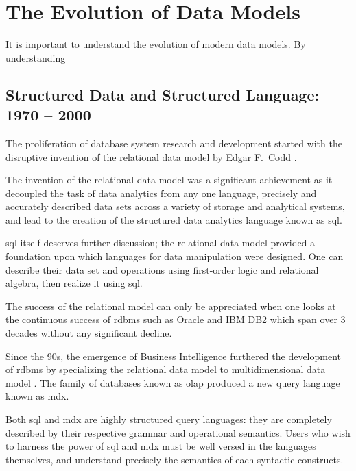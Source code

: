 



\section{The Evolution of Data Models}
	It is important to understand the evolution of modern data models.  By understanding 
	
	\subsection{Structured Data and Structured Language:  1970 -- 2000}
		The proliferation of database system research and development started with the disruptive invention of the relational data model by Edgar F.~Codd \cite{codd-79}.
		
		The invention of the relational data model was a significant achievement as it decoupled the task of data analytics from any one language, precisely and accurately described data sets across a variety of storage and analytical systems, and lead to the creation of the structured data analytics language known as \gls{sql}.
		
		\gls{sql} itself deserves further discussion; the relational data model provided a foundation upon which languages for data manipulation were designed.  One can describe their data set and operations using first-order logic and relational algebra, then realize it using \gls{sql}.
		
		The success of the relational model can only be appreciated when one looks at the continuous success of \gls{rdbms} such as Oracle and IBM DB2 which span over 3 decades without any significant decline.
		
		Since the 90s, the emergence of Business Intelligence \cite{bikm-02} furthered the development of \gls{rdbms} by specializing the relational data model to multidimensional data model \cite{colliat-96}.  The family of databases known as \gls{olap} produced a new query language known as \gls{mdx}.
		
		Both \gls{sql} and \gls{mdx} are highly structured query languages: they are completely described by their respective grammar and operational semantics.  Users who wish to harness the power of \gls{sql} and \gls{mdx} must be well versed in the languages themselves, and understand precisely the semantics of each syntactic constructs.
		
